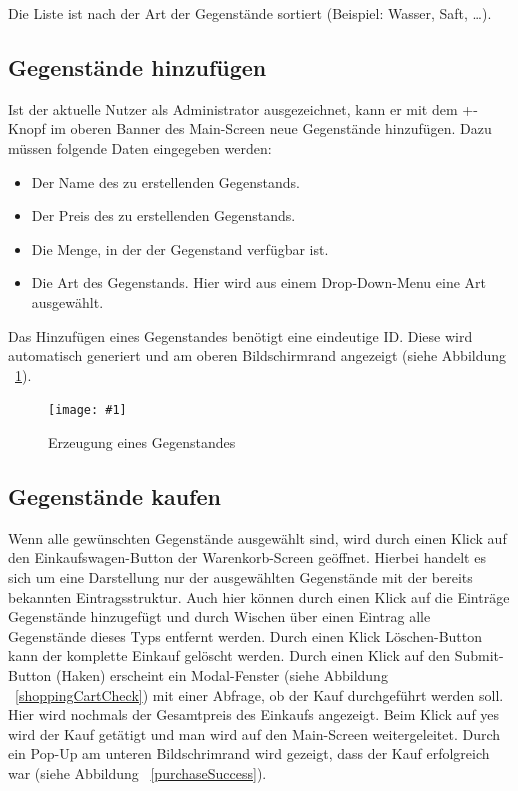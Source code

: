 \documentclass{scrartcl}
\newcommand{\cfigure}[3]{%
\begin{figure}[ht]
	\centering
	\texttt{[image: \#1]}
	\caption{#2}{#3} %
\end{figure}
}
\begin{document}
	Die Liste ist nach der Art der Gegenstände sortiert (Beispiel: Wasser, Saft, \ldots).

	\subsection{Gegenstände hinzufügen}\label{subsec:gegenstände-hinzufügen}

	Ist der aktuelle Nutzer als Administrator ausgezeichnet, kann er mit dem +-Knopf im oberen Banner des Main-Screen neue Gegenstände hinzufügen.
	Dazu müssen folgende Daten eingegeben werden:

	\begin{itemize}
		\item Der Name des zu erstellenden Gegenstands.

		\item Der Preis des zu erstellenden Gegenstands.

		\item Die Menge, in der der Gegenstand verfügbar ist.

		\item Die Art des Gegenstands.
		Hier wird aus einem Drop-Down-Menu eine Art ausgewählt.
	\end{itemize}

	Das Hinzufügen eines Gegenstandes benötigt eine eindeutige ID. Diese wird automatisch generiert und am oberen Bildschirmrand angezeigt (siehe Abbildung ~\ref{createItem}).

	\cfigure{figures/placeholder.png}{Erzeugung eines Gegenstandes}{\label{createItem}}

	\subsection{Gegenstände kaufen}\label{subsec:gegenstände-kaufen}

	Wenn alle gewünschten Gegenstände ausgewählt sind, wird durch einen Klick auf den Einkaufswagen-Button der Warenkorb-Screen geöffnet.
	Hierbei handelt es sich um eine Darstellung nur der ausgewählten Gegenstände mit der bereits bekannten Eintragsstruktur.
	Auch hier können durch einen Klick auf die Einträge Gegenstände hinzugefügt und durch Wischen über einen Eintrag alle Gegenstände dieses Typs entfernt werden.
	Durch einen Klick Löschen-Button kann der komplette Einkauf gelöscht werden.
	Durch einen Klick auf den Submit-Button (Haken) erscheint ein Modal-Fenster (siehe Abbildung ~\ref{shoppingCartCheck}) mit einer Abfrage, ob der Kauf durchgeführt werden soll.
	Hier wird nochmals der Gesamtpreis des Einkaufs angezeigt.
	Beim Klick auf \glqq yes\grqq{} wird der Kauf getätigt und man wird auf den Main-Screen weitergeleitet.
	Durch ein Pop-Up am unteren Bildschrimrand wird gezeigt, dass der Kauf erfolgreich war (siehe Abbildung ~\ref{purchaseSuccess}).
\end{document}
